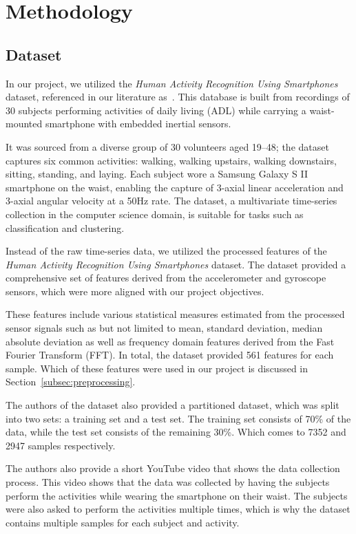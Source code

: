 \section{Methodology}\label{sec:methology}

\subsection{Dataset}\label{subsec:dataset}

In our project, we utilized the \emph{Human Activity Recognition Using Smartphones} dataset, referenced in our literature as~\cite{misc_human_activity_recognition_using_smartphones_240}.
This database is built from recordings of 30 subjects performing activities of daily living (ADL) while carrying a waist-mounted smartphone with embedded inertial sensors.

It was sourced from a diverse group of 30 volunteers aged 19--48; the dataset captures six common activities: walking, walking upstairs, walking downstairs, sitting, standing, and laying.
Each subject wore a Samsung Galaxy S II smartphone on the waist, enabling the capture of 3-axial linear acceleration and 3-axial angular velocity at a 50Hz rate.
The dataset, a multivariate time-series collection in the computer science domain, is suitable for tasks such as classification and clustering.

Instead of the raw time-series data, we utilized the processed features of the \emph{Human Activity Recognition Using Smartphones} dataset.
The dataset provided a comprehensive set of features derived from the accelerometer and gyroscope sensors, which were more aligned with our project objectives.

These features include various statistical measures estimated from the processed sensor signals such as but not limited to mean, standard deviation, median absolute deviation as well as frequency domain features derived from the Fast Fourier Transform (FFT).
In total, the dataset provided 561 features for each sample.
Which of these features were used in our project is discussed in Section~\ref{subsec:preprocessing}.

The authors of the dataset also provided a partitioned dataset, which was split into two sets: a training set and a test set.
The training set consists of 70\% of the data, while the test set consists of the remaining 30\%.
Which comes to 7352 and 2947 samples respectively.

The authors also provide a short YouTube video \cite{youtube_recording_of_the_experiment_240} that shows the data collection process.
This video shows that the data was collected by having the subjects perform the activities while wearing the smartphone on their waist.
The subjects were also asked to perform the activities multiple times, which is why the dataset contains multiple samples for each subject and activity.

